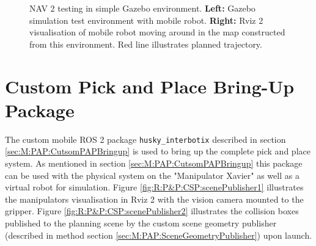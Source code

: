 \begin{figure}[H]
\begin{minipage}[b]{0.49\textwidth}
  \end{minipage}
  \caption{NAV 2 testing in simple Gazebo environment. \textbf{Left:} Gazebo simulation test environment with mobile robot. \textbf{Right:} Rviz 2 visualisation of mobile robot moving around in the map constructed from this environment. Red line illustrates planned trajectory.}
  \label{fig:R:H:NAV:figNav2Sim}
\end{figure}





\section{Custom Pick and Place Bring-Up Package}
 The custom mobile ROS 2 package \lstinline{husky_interbotix} described in section \ref{sec:M:PAP:CutsomPAPBringup} is used to bring up the complete pick and place system. As mentioned in section \ref{sec:M:PAP:CutsomPAPBringup} this package can be used with the physical system on the "Manipulator Xavier" as well as a virtual robot for simulation. Figure \ref{fig:R:P&P:CSP:scenePublisher1} illustrates the manipulators visualisation in Rviz 2 with the vision camera mounted to the gripper. Figure \ref{fig:R:P&P:CSP:scenePublisher2} illustrates the collision boxes published to the planning scene by the custom scene geometry publisher (described in method section \ref{sec:M:PAP:SceneGeometryPublisher}) upon launch.

